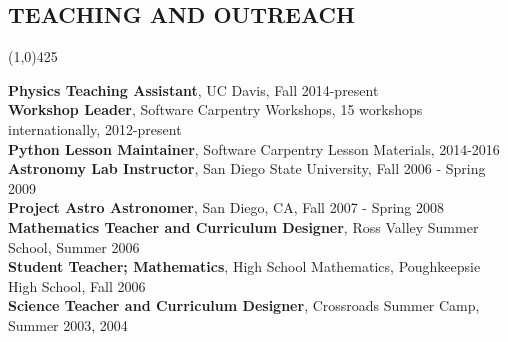 \documentclass{res}
\begin{document}
\begin{resume}
\section{TEACHING AND OUTREACH}
\vspace{-.2in} 
\begin{center}
\line(1,0){425}
\end{center}
\vspace{-.24in} 
\vspace{0.1in}
   {\bf Physics Teaching Assistant}, UC Davis, Fall 2014-present \\
   {\bf  Workshop Leader}, Software Carpentry Workshops, 15 workshops internationally, 2012-present \\	
   {\bf Python Lesson Maintainer}, Software Carpentry Lesson Materials, 2014-2016\\
   {\bf  Astronomy Lab Instructor}, San Diego State University, Fall 2006 - Spring 2009  \\
   {\bf Project Astro Astronomer}, San Diego, CA, Fall 2007 - Spring 2008 \\
   {\bf Mathematics Teacher and Curriculum Designer}, Ross Valley Summer School, Summer 2006 \\
   {\bf Student Teacher; Mathematics}, High School Mathematics, Poughkeepsie High School,  Fall 2006 \\
   {\bf Science Teacher and Curriculum Designer}, Crossroads Summer Camp, Summer 2003, 2004 \\


\end{resume}
\end{document}

